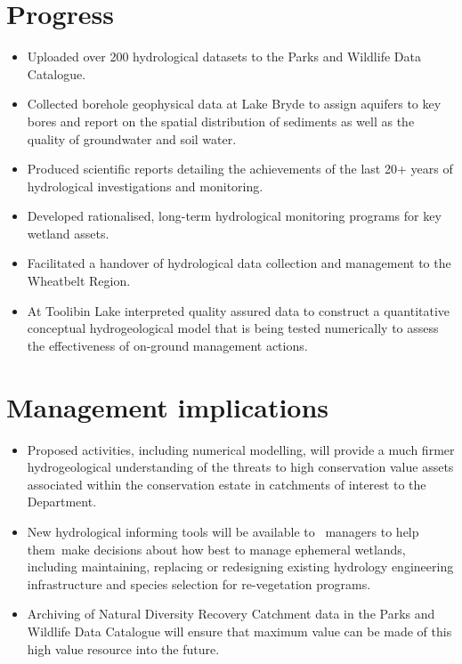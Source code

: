 \documentclass[version=last,
    paper=a4, %
    10pt, %
    usenames,
    dvipsnames,
    oneside, %
    headings=openany, %
    DIV=15 %
]{scrbook}
\begin{document}
\section*{Progress}
\begin{itemize}
\itemsep1pt\parskip0pt
\item
  Uploaded over 200 hydrological datasets to the Parks and Wildlife Data
  Catalogue.
\item
  Collected borehole geophysical data at Lake Bryde to assign aquifers
  to key bores and report on the spatial distribution of sediments as
  well as the quality of groundwater and soil water.
\item
  Produced scientific reports detailing the achievements of the last 20+
  years of hydrological investigations and monitoring.
\item
  Developed rationalised, long-term hydrological monitoring programs for
  key wetland assets.
\item
  Facilitated a handover of hydrological data collection and management
  to the Wheatbelt Region.
\item
  At Toolibin Lake interpreted quality assured data to construct a
  quantitative conceptual hydrogeological model that is being tested
  numerically to assess the effectiveness of on-ground management
  actions.
\end{itemize}



\section*{Management implications}
\begin{itemize}
\itemsep1pt\parskip0pt
\item
  Proposed activities, including numerical modelling, will provide a
  much firmer hydrogeological understanding of the threats to high
  conservation value assets associated within the conservation estate in
  catchments of interest to the Department.
\item
  New hydrological informing tools will be available to~ managers to
  help them~make decisions about how best to manage ephemeral wetlands,
  including maintaining, replacing or redesigning existing hydrology
  engineering infrastructure and species selection for re-vegetation
  programs.
\item
  Archiving of Natural Diversity Recovery Catchment data in the Parks
  and Wildlife Data Catalogue will ensure that maximum value can be made
  of this high value resource into the future.
\end{itemize}
\end{document}
